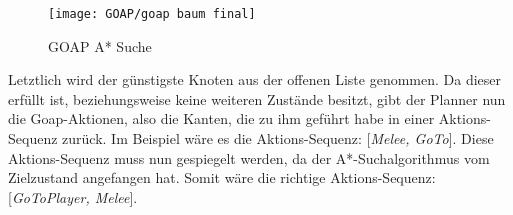\begin{figure}[h]
  \centering
  \texttt{[image: GOAP/goap baum final]}
	\captionsetup{justification=justified, format=plain}
  \caption{GOAP A* Suche}
  \label{fig:goap5}
\end{figure}

Letztlich wird der günstigste Knoten aus der offenen Liste genommen. Da dieser erfüllt ist, beziehungsweise keine weiteren Zustände besitzt, gibt der Planner nun die Goap-Aktionen, also die Kanten, die zu ihm geführt habe in einer Aktions-Sequenz zurück. Im Beispiel wäre es die Aktions-Sequenz: [\textit{Melee, GoTo}]. Diese Aktions-Sequenz muss nun gespiegelt werden, da der A*-Suchalgorithmus vom Zielzustand angefangen hat. Somit wäre die richtige Aktions-Sequenz: [\textit{GoToPlayer, Melee}].
